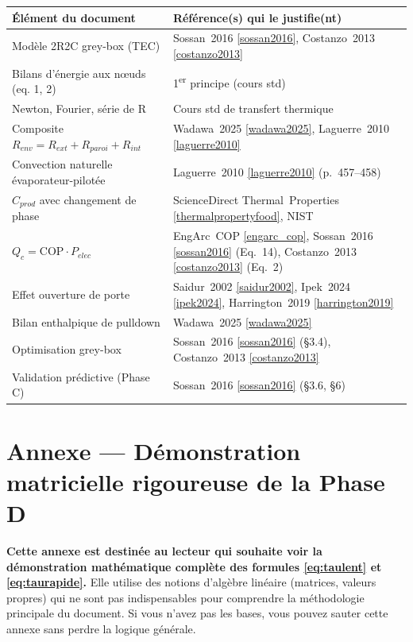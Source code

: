 \documentclass[11pt,a4paper]{article}
\begin{document}
\begin{center}
\renewcommand{\arraystretch}{1.3}
\begin{tabular}{p{6.5cm}p{8cm}}
\toprule
\textbf{Élément du document} & \textbf{Référence(s) qui le justifie(nt)} \\
\midrule
Modèle 2R2C grey-box (TEC) & Sossan~2016 \ref{sossan2016}, Costanzo~2013 \ref{costanzo2013} \\
Bilans d'énergie aux nœuds (eq. 1, 2) & 1\textsuperscript{er} principe (cours std) \\
Newton, Fourier, série de R & Cours std de transfert thermique \\
Composite $R_{env} = R_{ext}+R_{paroi}+R_{int}$ & Wadawa~2025 \ref{wadawa2025}, Laguerre~2010 \ref{laguerre2010} \\
Convection naturelle évaporateur-pilotée & Laguerre~2010 \ref{laguerre2010} (p.~457--458) \\
$C_{prod}$ avec changement de phase & ScienceDirect Thermal~Properties \ref{thermalpropertyfood}, NIST \\
$Q_c = \mathrm{COP} \cdot P_{elec}$ & EngArc~COP \ref{engarc_cop}, Sossan~2016 \ref{sossan2016} (Eq.~14), Costanzo~2013 \ref{costanzo2013} (Eq.~2) \\
Effet ouverture de porte & Saidur~2002 \ref{saidur2002}, Ipek~2024 \ref{ipek2024}, Harrington~2019 \ref{harrington2019} \\
Bilan enthalpique de pulldown & Wadawa~2025 \ref{wadawa2025} \\
Optimisation grey-box & Sossan~2016 \ref{sossan2016} (\S3.4), Costanzo~2013 \ref{costanzo2013} \\
Validation prédictive (Phase C) & Sossan~2016 \ref{sossan2016} (\S3.6, \S6) \\
\bottomrule
\end{tabular}
\end{center}

\appendix
\section{Annexe — Démonstration matricielle rigoureuse de la Phase D}\label{sec:annexe_matrice}

\textbf{Cette annexe est destinée au lecteur qui souhaite voir la démonstration mathématique
complète des formules \eqref{eq:taulent} et \eqref{eq:taurapide}.} Elle utilise des notions
d'algèbre linéaire (matrices, valeurs propres) qui ne sont pas indispensables pour
comprendre la méthodologie principale du document. Si vous n'avez pas les bases, vous
pouvez sauter cette annexe sans perdre la logique générale.
\end{document}
